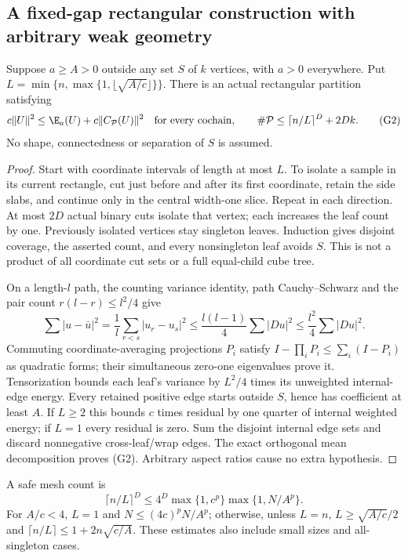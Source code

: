 \subsection{A fixed-gap rectangular construction with arbitrary weak geometry}
\begin{lemma}\label{lem:geo-isolate}
Suppose $a\geq A>0$ outside any set $S$ of $k$ vertices, with $a>0$
everywhere. Put $L=\min\{n,\max\{1,\lfloor\sqrt{A/c}\rfloor\}\}$.
There is an actual rectangular partition satisfying
\[
 c\|U\|^2\leq\E_a(U)+c\|C_{\mathcal P}(U)\|^2
 \quad\hbox{for every cochain},\qquad
 \#\mathcal P\leq\lceil n/L\rceil^D+2Dk.                  \tag{G2}
\]
No shape, connectedness or separation of $S$ is assumed.
\end{lemma}
\begin{proof}
Start with coordinate intervals of length at most $L$. To isolate a sample
in its current rectangle, cut just before and after its first coordinate,
retain the side slabs, and continue only in the central width-one slice.
Repeat in each direction. At most $2D$ actual binary cuts isolate that
vertex; each increases the leaf count by one. Previously isolated vertices
stay singleton leaves. Induction gives disjoint coverage, the asserted
count, and every nonsingleton leaf avoids $S$. This is not a product of
all coordinate cut sets or a full equal-child cube tree.

On a length-$l$ path, the counting variance identity, path Cauchy--Schwarz
and the pair count $r(l-r)\leq l^2/4$ give
\[
 \sum|u-\bar u|^2=\frac1l\sum_{r<s}|u_r-u_s|^2
 \leq\frac{l(l-1)}4\sum|Du|^2\leq\frac{l^2}4\sum|Du|^2.
\]
Commuting coordinate-averaging projections $P_i$ satisfy
$I-\prod_iP_i\leq\sum_i(I-P_i)$ as quadratic forms; their simultaneous
zero-one eigenvalues prove it. Tensorization bounds each leaf's variance
by $L^2/4$ times its unweighted internal-edge energy. Every retained
positive edge starts outside $S$, hence has coefficient at least $A$.
If $L\geq2$ this bounds $c$ times residual by one quarter of internal
weighted energy; if $L=1$ every residual is zero. Sum the disjoint internal
edge sets and discard nonnegative cross-leaf/wrap edges. The exact
orthogonal mean decomposition proves (G2). Arbitrary aspect ratios cause
no extra hypothesis.
\end{proof}
A safe mesh count is
\[
 \lceil n/L\rceil^D\leq4^D\max\{1,c^p\}\max\{1,N/A^p\}.
\]
For $A/c<4$, $L=1$ and $N\leq(4c)^pN/A^p$; otherwise, unless $L=n$,
$L\geq\sqrt{A/c}/2$ and $\lceil n/L\rceil\leq1+2n\sqrt{c/A}$.
These estimates also include small sizes and all-singleton cases.

